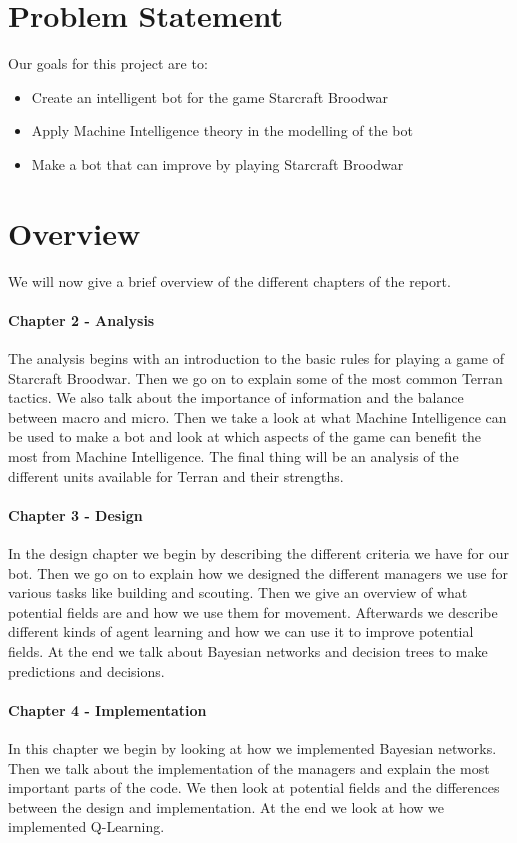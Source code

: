 \section{Problem Statement}
	Our goals for this project are to:
	\begin{itemize}
		\item Create an intelligent bot for the game Starcraft Broodwar
		\item Apply Machine Intelligence theory in the modelling of the bot
		\item Make a bot that can improve by playing Starcraft Broodwar
	\end{itemize}

\section{Overview}
	We will now give a brief overview of the different chapters of the report.

\paragraph*{Chapter 2 - Analysis}
The analysis begins with an introduction to the basic rules for playing a game of Starcraft Broodwar. Then we go on to explain some of the most common Terran tactics. We also talk about the importance of information and the balance between macro and micro. Then we take a look at what Machine Intelligence can be used to make a bot and look at which aspects of the game can benefit the most from Machine Intelligence. The final thing will be an analysis of the different units available for Terran and their strengths.

\paragraph*{Chapter 3 - Design}
In the design chapter we begin by describing the different criteria we have for our bot. Then we go on to explain how we designed the different managers we use for various tasks like building and scouting. Then we give an overview of what potential fields are and how we use them for movement. Afterwards we describe different kinds of agent learning and how we can use it to improve potential fields. At the end we talk about Bayesian networks and decision trees to make predictions and decisions.

\paragraph*{Chapter 4 - Implementation}
In this chapter we begin by looking at how we implemented Bayesian networks. Then we talk about the implementation of the managers and explain the most important parts of the code. We then look at potential fields and the differences between the design and implementation. At the end we look at how we implemented Q-Learning.


